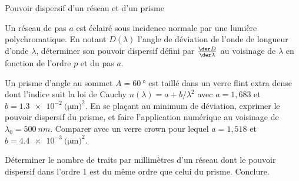 
\begin{exo}[PC][1]{Pouvoir dispersif d'un réseau et d'un prisme}
\begin{quest}
\item Un réseau de pas $a$ est éclairé sous incidence normale par une lumière polychromatique. En notant $D(\lambda)$ l'angle de déviation de l'onde de longueur d'onde $\lambda$, déterminer son pouvoir dispersif défini par $\frac{\der D}{\der \lambda}$ au voisinage de $\lambda$ en fonction de l'ordre $p$ et du pas $a$.
\item Un prisme d'angle au sommet $A=\SI{60}{\degree}$ est taillé dans un verre flint extra dense dont l'indice suit la loi de Cauchy $n(\lambda)=a+b/\lambda^2$ avec $a=1,683$ et $b=\SI{1.3e-2}{(\micro\meter)^{2}}$. En se plaçant au minimum de déviation, exprimer le pouvoir dispersif du prisme, et faire l'application numérique au voisinage de $\lambda_0=\SI{500}{nm}$. Comparer avec un verre crown pour lequel $a=1,518$ et $b=\SI{4,4e-3}{(\micro\meter)^2}$.
\item Déterminer le nombre de traits par millimètres d'un réseau dont le pouvoir dispersif dans l'ordre 1 est du même ordre que celui du prisme. Conclure.
\end{quest}
\end{exo}


